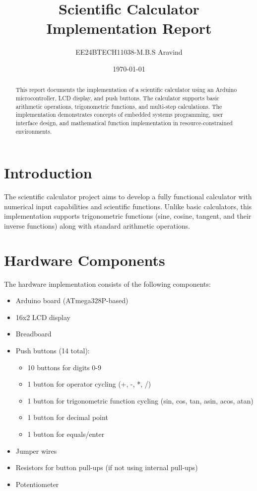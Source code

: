 \documentclass[12pt,a4paper]{article}
\title{Scientific Calculator Implementation Report}
\author{EE24BTECH11038-M.B.S Aravind}
\date{\today}
\begin{document}
\maketitle

\begin{abstract}
This report documents the implementation of a scientific calculator using an Arduino microcontroller, LCD display, and push buttons. The calculator supports basic arithmetic operations, trigonometric functions, and multi-step calculations. The implementation demonstrates concepts of embedded systems programming, user interface design, and mathematical function implementation in resource-constrained environments.
\end{abstract}

\tableofcontents
\newpage

\section{Introduction}
The scientific calculator project aims to develop a fully functional calculator with numerical input capabilities and scientific functions. Unlike basic calculators, this implementation supports trigonometric functions (sine, cosine, tangent, and their inverse functions) along with standard arithmetic operations.

\section{Hardware Components}
The hardware implementation consists of the following components:
\begin{itemize}
    \item Arduino board (ATmega328P-based)
    \item 16x2 LCD display
    \item Breadboard
    \item Push buttons (14 total):
    \begin{itemize}
        \item 10 buttons for digits 0-9
        \item 1 button for operator cycling (+, -, *, /)
        \item 1 button for trigonometric function cycling (sin, cos, tan, asin, acos, atan)
        \item 1 button for decimal point
        \item 1 button for equals/enter
    \end{itemize}
    \item Jumper wires
    \item Resistors for button pull-ups (if not using internal pull-ups)
    \item Potentiometer
\end{itemize}
\end{document}
